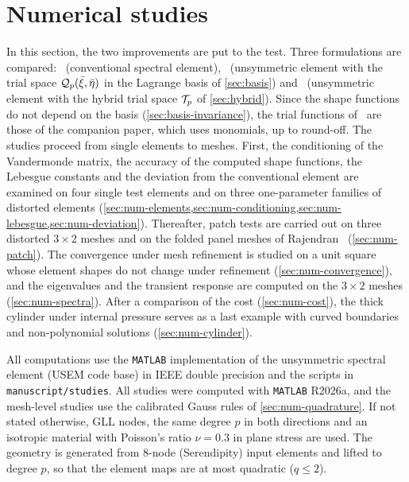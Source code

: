 \section{Numerical studies}
\label{sec:numerics}
%
In this section, the two improvements are put to the test. Three formulations are compared: \PP\ (conventional spectral element), \PM\ (unsymmetric element with the trial space $\mathcal Q_p(\bar\xi,\bar\eta)$ in the Lagrange basis of \cref{sec:basis}) and \PH\ (unsymmetric element with the hybrid trial space $\mathcal T_p$ of \cref{sec:hybrid}). Since the shape functions do not depend on the basis (\cref{sec:basis-invariance}), the trial functions of \PM\ are those of the companion paper, which uses monomials, up to round-off. The studies proceed from single elements to meshes. First, the conditioning of the Vandermonde matrix, the accuracy of the computed shape functions, the Lebesgue constants and the deviation from the conventional element are examined on four single test elements and on three one-parameter families of distorted elements (\cref{sec:num-elements,sec:num-conditioning,sec:num-lebesgue,sec:num-deviation}). Thereafter, patch tests are carried out on three distorted $3\times2$ meshes and on the folded panel meshes of Rajendran~\cite{Rajendran2010technique} (\cref{sec:num-patch}). The convergence under mesh refinement is studied on a unit square whose element shapes do not change under refinement (\cref{sec:num-convergence}), and the eigenvalues and the transient response are computed on the $3\times2$ meshes (\cref{sec:num-spectra}). After a comparison of the cost (\cref{sec:num-cost}), the thick cylinder under internal pressure serves as a last example with curved boundaries and non-polynomial solutions (\cref{sec:num-cylinder}).

All computations use the \texttt{MATLAB} implementation of the unsymmetric spectral element (USEM code base) in IEEE double precision and the scripts in \texttt{manuscript/studies}. All studies were computed with \texttt{MATLAB} R2026a, and the mesh-level studies use the calibrated Gauss rules of \cref{sec:num-quadrature}. If not stated otherwise, GLL nodes, the same degree $p$ in both directions and an isotropic material with Poisson's ratio $\nu=0.3$ in plane stress are used. The geometry is generated from 8-node (Serendipity) input elements and lifted to degree $p$, so that the element maps are at most quadratic ($q\le2$).
%

